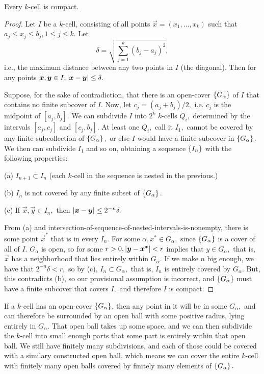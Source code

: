 \documentclass{article}
\begin{document}
\begin{theorem}\label{every-k-cell-is-compact}
Every $k$-cell is \@{compact}.
\end{theorem}
\begin{proof}
Let $I$ be a $k$-cell, consisting of all points $\vec{x} = (x_1, \dots, x_k)$ such that $a_j \leq x_j \leq b_j, 1 \leq j \leq k.$ Let
\[ \delta = { \sqrt{\sum_{j=1}^k (b_j - a_j)^2}  }, \]
i.e., the maximum distance between any two points in $I$ (the diagonal). Then for any points $\boldsymbol{x}, \boldsymbol{y} \in I, \left| \boldsymbol{x} - \boldsymbol{y} \right| \leq \delta.$

Suppose, for the sake of contradiction, that there is an \@{open-cover} $\left\{ G_\alpha \right\}$ of $I$ that contains no finite subcover of $I.$ Now, let $c_j = (a_j + b_j)/2,$ i.e. $c_j$ is the midpoint of $[a_j, b_j].$ We can subdivide $I$ into $2^k$ $k$-cells $Q_i,$ determined by the \@{intervals} $[a_j, c_j]$ and $[c_j, b_j].$ At least one $Q_i,$ call it $I_1,$ cannot be covered by any finite subcollection of $\left\{ G_\alpha \right\},$ or else $I$ would have a finite subcover in $\left\{ G_\alpha \right\}.$ We then can subdivide $I_1$ and so on, obtaining a \@{sequence} $\left\{ I_n \right\}$ with the following properties:

(a) $I_{n+1} \subset I_{n}$ (each $k$-cell in the sequence is nested in the previous.)

(b) $I_n$ is not covered by any finite subset of $\left\{ G_\alpha \right\}.$

(c) If $\vec{x}, \vec{y} \in I_n,$ then $\left| \boldsymbol{x} - \boldsymbol{y} \right| \leq 2^{-n} \delta.$

From (a) and \@{intersection-of-sequence-of-nested-intervals-is-nonempty}, there is some point $\vec{x}^*$ that is in every $I_n.$ For some $\alpha, x^* \in G_\alpha,$ since $\left\{ G_\alpha \right\}$ is a cover of all of $I.$ $G_\alpha$ is \@{open}, so for some $r > 0, \left| \boldsymbol{y} - \boldsymbol{x^*} \right| < r$ implies that $y \in G_\alpha,$ that is, $\vec{x}$ has a \@{neighborhood} that lies entirely within $G_\alpha.$ If we make $n$ big enough, we have that $2^{-n} \delta < r,$ so by (c), $I_n \subset G_\alpha,$ that is, $I_n$ is entirely covered by $G_\alpha.$ But, this contradicts (b), so our provisional assumption is incorrect, and $\left\{ G_\alpha \right\}$ must have a finite subcover that covers $I,$ and therefore $I$ is \@{compact}.
\end{proof}
\begin{intuition}
If a $k$-cell has an \@{open-cover} $\left\{ G_\alpha \right\}$, then any point in it will be in some $G_\alpha,$ and can therefore be surrounded by an open \@{ball} with some positive radius, lying entirely in $G_\alpha$. That open ball takes up some space, and we can then subdivide the $k$-cell into small enough parts that some part is entirely within that open ball. We still have finitely many subdivisions, and each of those could be covered with a similary constructed open ball, which means we can cover the entire $k$-cell with finitely many open balls covered by finitely many elements of $\left\{ G_\alpha \right\}.$
\end{intuition}
\end{document}
